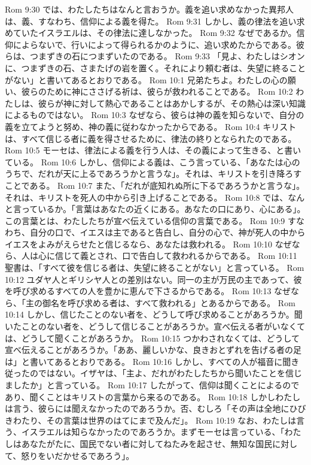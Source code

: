 Rom 9:30  では、わたしたちはなんと言おうか。義を追い求めなかった異邦人は、義、すなわち、信仰による義を得た。
Rom 9:31  しかし、義の律法を追い求めていたイスラエルは、その律法に達しなかった。
Rom 9:32  なぜであるか。信仰によらないで、行いによって得られるかのように、追い求めたからである。彼らは、つまずきの石につまずいたのである。
Rom 9:33  「見よ、わたしはシオンに、つまずきの石、さまたげの岩を置く。それにより頼む者は、失望に終ることがない」と書いてあるとおりである。
Rom 10:1  兄弟たちよ。わたしの心の願い、彼らのために神にささげる祈は、彼らが救われることである。
Rom 10:2  わたしは、彼らが神に対して熱心であることはあかしするが、その熱心は深い知識によるものではない。
Rom 10:3  なぜなら、彼らは神の義を知らないで、自分の義を立てようと努め、神の義に従わなかったからである。
Rom 10:4  キリストは、すべて信じる者に義を得させるために、律法の終りとなられたのである。
Rom 10:5  モーセは、律法による義を行う人は、その義によって生きる、と書いている。
Rom 10:6  しかし、信仰による義は、こう言っている、「あなたは心のうちで、だれが天に上るであろうかと言うな」。それは、キリストを引き降ろすことである。
Rom 10:7  また、「だれが底知れぬ所に下るであろうかと言うな」。それは、キリストを死人の中から引き上げることである。
Rom 10:8  では、なんと言っているか。「言葉はあなたの近くにある。あなたの口にあり、心にある」。この言葉とは、わたしたちが宣べ伝えている信仰の言葉である。
Rom 10:9  すなわち、自分の口で、イエスは主であると告白し、自分の心で、神が死人の中からイエスをよみがえらせたと信じるなら、あなたは救われる。
Rom 10:10  なぜなら、人は心に信じて義とされ、口で告白して救われるからである。
Rom 10:11  聖書は、「すべて彼を信じる者は、失望に終ることがない」と言っている。
Rom 10:12  ユダヤ人とギリシヤ人との差別はない。同一の主が万民の主であって、彼を呼び求めるすべての人を豊かに恵んで下さるからである。
Rom 10:13  なぜなら、「主の御名を呼び求める者は、すべて救われる」とあるからである。
Rom 10:14  しかし、信じたことのない者を、どうして呼び求めることがあろうか。聞いたことのない者を、どうして信じることがあろうか。宣べ伝える者がいなくては、どうして聞くことがあろうか。
Rom 10:15  つかわされなくては、どうして宣べ伝えることがあろうか。「ああ、麗しいかな、良きおとずれを告げる者の足は」と書いてあるとおりである。
Rom 10:16  しかし、すべての人が福音に聞き従ったのではない。イザヤは、「主よ、だれがわたしたちから聞いたことを信じましたか」と言っている。
Rom 10:17  したがって、信仰は聞くことによるのであり、聞くことはキリストの言葉から来るのである。
Rom 10:18  しかしわたしは言う、彼らには聞えなかったのであろうか。否、むしろ「その声は全地にひびきわたり、その言葉は世界のはてにまで及んだ」。
Rom 10:19  なお、わたしは言う、イスラエルは知らなかったのであろうか。まずモーセは言っている、「わたしはあなたがたに、国民でない者に対してねたみを起させ、無知な国民に対して、怒りをいだかせるであろう」。
